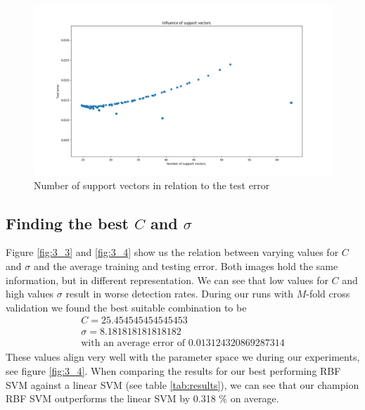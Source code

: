 \begin{figure}[!h]
\begin{center}
\centering
\includegraphics[width=1\textwidth]{figures/new/3_Figure_2}
\end{center}
\caption{\label{fig:3_2} Number of support vectors in relation to the test error}
\end{figure}


\subsection{Finding the best $C$ and $\sigma$}

Figure \ref{fig:3_3} and \ref{fig:3_4} show us the relation between varying values for $C$ and $\sigma$ and the average training and testing error. Both images hold the same information, but in different representation. We can see that low values for $C$ and high values $\sigma$  result in worse detection rates. 
During our runs with $M$-fold cross validation we found the best suitable combination to be 
\begin{align*}
C= 25.454545454545453\\
\sigma=8.181818181818182 \\
\text{with an average error of } 0.013124320869287314
\end{align*}
These values align very well with the parameter space we during our experiments, see figure \ref{fig:3_4}. When comparing the results for our best performing RBF SVM against a linear SVM (see table \ref{tab:results}), we can see that our champion RBF SVM outperforms the linear SVM by 0.318 \% on average.

